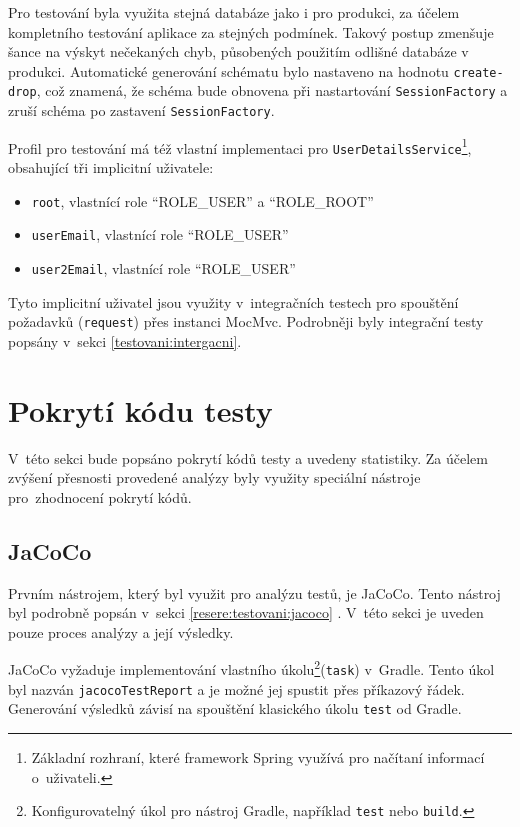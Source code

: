     Pro testování byla využita stejná databáze jako i pro produkci, za účelem kompletního testování aplikace za stejných podmínek. Takový postup zmenšuje šance na výskyt nečekaných chyb, působených použitím odlišné databáze v produkci. Automatické generování schématu bylo nastaveno na hodnotu \verb|create-drop|, což znamená, že schéma bude obnovena při nastartování \verb|SessionFactory| a zruší schéma po zastavení \verb|SessionFactory|.
    
    Profil pro testování má též vlastní implementaci pro \verb|UserDetailsService|\footnote{Základní rozhraní, které framework Spring využívá pro načítaní informací o~uživateli.}, obsahující tři implicitní uživatele:
    \begin{itemize}
            \setlength\itemsep{0.3em}
            \item \verb|root|, vlastnící role \enquote{ROLE\_USER} a \enquote{ROLE\_ROOT} 
            \item \verb|userEmail|, vlastnící role \enquote{ROLE\_USER}
            \item \verb|user2Email|, vlastnící role \enquote{ROLE\_USER}
    \end{itemize}
    Tyto implicitní uživatel jsou využity v~integračních testech pro spouštění požadavků (\verb|request|) přes instanci MocMvc. Podrobněji byly integrační testy popsány v~sekci \ref{testovani:intergacni}.
    
\section{Pokrytí kódu testy}\label{testovani:pokryti}
    V~této sekci bude popsáno pokrytí kódů testy a uvedeny statistiky. Za účelem zvýšení přesnosti provedené analýzy byly využity speciální nástroje pro~zhodnocení pokrytí kódů.
    
    \subsection{JaCoCo}
    Prvním nástrojem, který byl využit pro analýzu testů, je JaCoCo. Tento nástroj byl podrobně popsán v~sekci \ref{resere:testovani:jacoco} . V~této sekci je uveden pouze proces analýzy a její výsledky.
    
    JaCoCo vyžaduje implementování vlastního úkolu\footnote{Konfigurovatelný úkol pro nástroj Gradle, například \texttt{test} nebo \texttt{build}.}(\verb|task|) v~Gradle. Tento úkol byl nazván \verb|jacocoTestReport| a je možné jej spustit přes příkazový řádek. Generování výsledků závisí na spouštění klasického úkolu \verb|test| od Gradle. 
    

